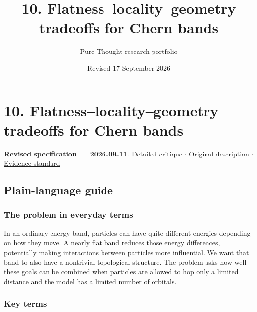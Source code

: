 \documentclass[
  11pt,
]{article}
\title{10. Flatness--locality--geometry tradeoffs for Chern bands}
\author{Pure Thought research portfolio}
\date{Revised 17 September 2026}
\begin{document}
\maketitle
\thispagestyle{empty}
\clearpage

\section{10. Flatness--locality--geometry tradeoffs for Chern bands}

\textbf{Revised specification --- 2026-09-11.}
\href{https://github.com/rick-stevens-ai/Pure-Thought/blob/main/reviews/10-Flat-Chern-Bands.md}{Detailed
critique} \ensuremath{\cdot}
\href{https://github.com/rick-stevens-ai/Pure-Thought/blob/main/archive/original-PRDs/10-Flat-Chern-Bands.md}{Original
description} \ensuremath{\cdot}
\href{https://github.com/rick-stevens-ai/Pure-Thought/blob/main/reviews/EVIDENCE-STANDARD.md}{Evidence
standard}

\subsection{Plain-language guide}

\subsubsection{The problem in everyday terms}

In an ordinary energy band, particles can have quite different energies
depending on how they move. A nearly flat band reduces those energy
differences, potentially making interactions between particles more
influential. We want that band to also have a nontrivial topological
structure. The problem asks how well these goals can be combined when
particles are allowed to hop only a limited distance and the model has a
limited number of orbitals.

\subsubsection{Key terms}
\end{document}
